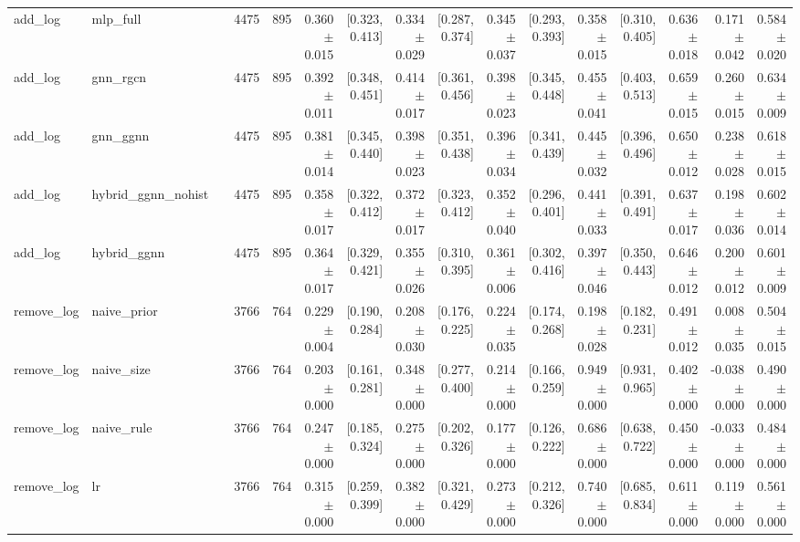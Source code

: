 \begin{table}[htbp]
{\begin{tabular}{llrrrrrrrrrrrrrr}
add\_log & mlp\_full &  & 4475 & 895 & 0.360 $\pm$ 0.015 & [0.323, 0.413] & 0.334 $\pm$ 0.029 & [0.287, 0.374] & 0.345 $\pm$ 0.037 & [0.293, 0.393] & 0.358 $\pm$ 0.015 & [0.310, 0.405] & 0.636 $\pm$ 0.018 & 0.171 $\pm$ 0.042 & 0.584 $\pm$ 0.020 \\
add\_log & gnn\_rgcn &  & 4475 & 895 & 0.392 $\pm$ 0.011 & [0.348, 0.451] & 0.414 $\pm$ 0.017 & [0.361, 0.456] & 0.398 $\pm$ 0.023 & [0.345, 0.448] & 0.455 $\pm$ 0.041 & [0.403, 0.513] & 0.659 $\pm$ 0.015 & 0.260 $\pm$ 0.015 & 0.634 $\pm$ 0.009 \\
add\_log & gnn\_ggnn &  & 4475 & 895 & 0.381 $\pm$ 0.014 & [0.345, 0.440] & 0.398 $\pm$ 0.023 & [0.351, 0.438] & 0.396 $\pm$ 0.034 & [0.341, 0.439] & 0.445 $\pm$ 0.032 & [0.396, 0.496] & 0.650 $\pm$ 0.012 & 0.238 $\pm$ 0.028 & 0.618 $\pm$ 0.015 \\
add\_log & hybrid\_ggnn\_nohist &  & 4475 & 895 & 0.358 $\pm$ 0.017 & [0.322, 0.412] & 0.372 $\pm$ 0.017 & [0.323, 0.412] & 0.352 $\pm$ 0.040 & [0.296, 0.401] & 0.441 $\pm$ 0.033 & [0.391, 0.491] & 0.637 $\pm$ 0.017 & 0.198 $\pm$ 0.036 & 0.602 $\pm$ 0.014 \\
add\_log & hybrid\_ggnn &  & 4475 & 895 & 0.364 $\pm$ 0.017 & [0.329, 0.421] & 0.355 $\pm$ 0.026 & [0.310, 0.395] & 0.361 $\pm$ 0.006 & [0.302, 0.416] & 0.397 $\pm$ 0.046 & [0.350, 0.443] & 0.646 $\pm$ 0.012 & 0.200 $\pm$ 0.012 & 0.601 $\pm$ 0.009 \\
remove\_log & naive\_prior &  & 3766 & 764 & 0.229 $\pm$ 0.004 & [0.190, 0.284] & 0.208 $\pm$ 0.030 & [0.176, 0.225] & 0.224 $\pm$ 0.035 & [0.174, 0.268] & 0.198 $\pm$ 0.028 & [0.182, 0.231] & 0.491 $\pm$ 0.012 & 0.008 $\pm$ 0.035 & 0.504 $\pm$ 0.015 \\
remove\_log & naive\_size &  & 3766 & 764 & 0.203 $\pm$ 0.000 & [0.161, 0.281] & 0.348 $\pm$ 0.000 & [0.277, 0.400] & 0.214 $\pm$ 0.000 & [0.166, 0.259] & 0.949 $\pm$ 0.000 & [0.931, 0.965] & 0.402 $\pm$ 0.000 & -0.038 $\pm$ 0.000 & 0.490 $\pm$ 0.000 \\
remove\_log & naive\_rule &  & 3766 & 764 & 0.247 $\pm$ 0.000 & [0.185, 0.324] & 0.275 $\pm$ 0.000 & [0.202, 0.326] & 0.177 $\pm$ 0.000 & [0.126, 0.222] & 0.686 $\pm$ 0.000 & [0.638, 0.722] & 0.450 $\pm$ 0.000 & -0.033 $\pm$ 0.000 & 0.484 $\pm$ 0.000 \\
remove\_log & lr &  & 3766 & 764 & 0.315 $\pm$ 0.000 & [0.259, 0.399] & 0.382 $\pm$ 0.000 & [0.321, 0.429] & 0.273 $\pm$ 0.000 & [0.212, 0.326] & 0.740 $\pm$ 0.000 & [0.685, 0.834] & 0.611 $\pm$ 0.000 & 0.119 $\pm$ 0.000 & 0.561 $\pm$ 0.000 \\

\end{tabular}}
\end{table}
